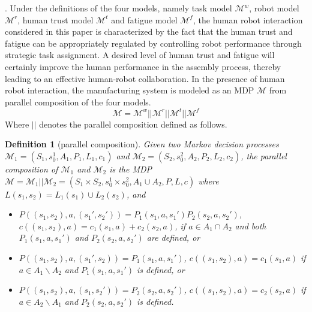 \documentclass[journal]{IEEEtran}
\newtheorem{definition}{Definition}
\begin{document}
. Under the definitions of the four models, namely task model $\mathcal{M}^w$, robot model $\mathcal{M}^r$, human trust model $\mathcal{M}^t$ and fatigue model $\mathcal{M}^f$, the human robot interaction considered in this paper is characterized by the fact that the human trust and fatigue can be appropriately regulated by controlling robot performance through strategic task assignment. A desired level of human trust and fatigue will certainly improve the human performance in the assembly process, thereby leading to an effective human-robot collaboration. %
In the presence of human robot interaction, the manufacturing system is modeled as an MDP $\mathcal{M}$ from parallel composition of the four models. 
$$
\mathcal{M}=\mathcal{M}^w||\mathcal{M}^r||\mathcal{M}^t||\mathcal{M}^f
$$
Where $||$ denotes the parallel composition defined as follows.
\begin{definition}[parallel composition]\label{def:parallel}
	Given two Markov decision processes $\mathcal{M}_1=(S_1,s^1_0,A_1,P_1,L_1, c_1)$ and $ \mathcal{M}_2=(S_2,s^2_0,A_2,P_2,L_2, c_2)$, the parallel composition of $\mathcal{M}_1$ and $\mathcal{M}_2$ is the MDP $\mathcal{M}=\mathcal{M}_1||\mathcal{M}_2=(S_1\times S_2,s^1_0\times s^2_0,A_1\cup A_2,P,L,c)$ where $L(s_1,s_2)=L_1(s_1)\cup L_2(s_2)$, and  
	\begin{itemize}
		\item	$P((s_1,s_2),a,(s_1',s_2'))=P_1(s_1,a,s_1')P_2(s_2,a,s_2')$, $c((s_1,s_2),a)=c_1(s_1,a)+c_2(s_2,a)$, if $a\in A_1\cap A_2$ and both $P_1(s_1,a,s_1')$ and $P_2(s_2,a,s_2')$ are defined, or
		\item $P((s_1,s_2),a,(s_1',s_2))=P_1(s_1,a,s_1')$, $c((s_1,s_2),a)=c_1(s_1,a)$ if $a\in A_1\backslash A_2$ and $P_1(s_1,a,s_1')$ is defined, or
		\item $P((s_1,s_2),a,(s_1,s_2'))=P_2(s_2,a,s_2')$, $c((s_1,s_2),a)=c_2(s_2,a)$ if $a\in A_2\backslash A_1$ and $P_2(s_2,a,s_2')$ is defined.
	\end{itemize}
\end{definition}
\end{document}
